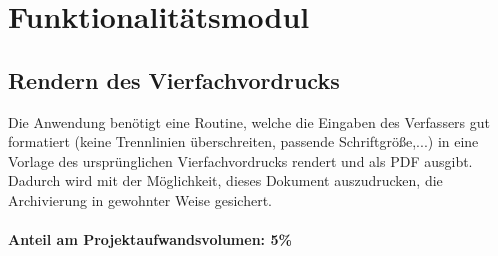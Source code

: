 \section{Funktionalitätsmodul}
\subsection{Rendern des Vierfachvordrucks}
Die Anwendung benötigt eine Routine, welche die Eingaben des Verfassers gut formatiert (keine Trennlinien überschreiten, passende Schriftgröße,...) in eine Vorlage des ursprünglichen Vierfachvordrucks rendert und als PDF ausgibt. Dadurch wird mit der Möglichkeit, dieses Dokument auszudrucken, die Archivierung in gewohnter Weise gesichert.\\ \\
\textbf{Anteil am Projektaufwandsvolumen: 5\%}